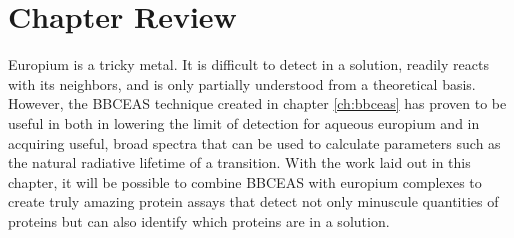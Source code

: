 \section*{Chapter Review}

Europium is a tricky metal. It is difficult to detect in a solution, readily
reacts with its neighbors, and is only partially understood from a theoretical
basis. However, the \ac{BBCEAS} technique created in chapter \ref{ch:bbceas}
has proven to be useful in both in lowering the limit of detection for aqueous
europium and in acquiring useful, broad spectra that can be used to calculate
parameters such as the natural radiative lifetime of a transition. With the
work laid out in this chapter, it will be possible to combine \ac{BBCEAS} with
europium complexes to create truly amazing protein assays that detect not only
minuscule quantities of proteins but can also identify which proteins are in a
solution.

